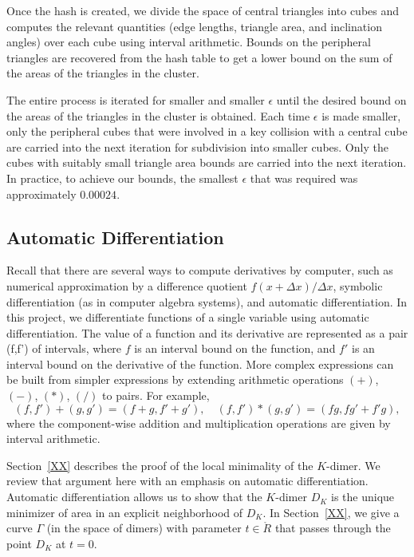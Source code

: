 Once the hash is created, we divide the space of central triangles into cubes and computes the relevant quantities
(edge lengths, triangle area, and inclination angles) over each cube using interval arithmetic.   Bounds on the peripheral
triangles are recovered from the hash table to get a lower bound on the sum of the areas of the triangles in the cluster.

The entire process is iterated for smaller and smaller $\epsilon$ until the desired bound on the areas of the triangles
in the cluster is obtained.   Each time $\epsilon$ is made smaller, only the peripheral cubes that were involved in a
key collision with a central cube are carried into the next iteration for subdivision into smaller cubes.  Only the cubes
with suitably small triangle area bounds are carried into the next iteration.  In practice, to achieve our bounds,
the smallest $\epsilon$ that
was required was approximately $0.00024$.

\subsection{Automatic Differentiation}

Recall that there are several ways to compute derivatives by computer, such as numerical approximation by
a difference quotient $f(x + \Delta x)/\Delta x$, symbolic differentiation (as in computer algebra systems), and
automatic differentiation.   In this project, we differentiate functions of a single variable using automatic differentiation.
The value of a function and its derivative are represented as a pair (f,f') of intervals, where $f$ is an interval bound
on the function, and $f'$ is an interval bound on the derivative of the function.    More complex expressions can be built
from simpler expressions by extending arithmetic operations $(+)$, $(-)$, $(*)$, $(/)$ to pairs.  For example,
\[
(f,f') + (g,g') = (f+g,f'+g'),\quad (f,f') * (g,g') = (f g,f g' + f' g),
\]
where the component-wise addition and multiplication operations are given by interval arithmetic.

Section~\ref{XX} describes the proof of the local minimality of the $K$-dimer.  We review that
argument here with an emphasis on automatic differentiation.
Automatic differentiation allows us to show that the $K$-dimer $D_K$ is the unique minimizer of area
in an explicit neighborhood of $D_K$.  In Section~\ref{XX}, we give a curve $\Gamma$ 
(in the space of dimers) with parameter $t\in\ring{R}$
that passes through the point $D_K$ at $t=0$.  

